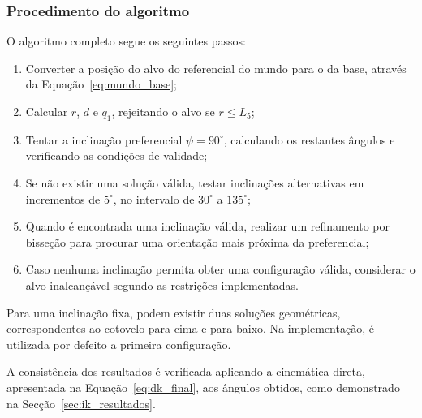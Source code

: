 \subsubsection*{Procedimento do algoritmo}

O algoritmo completo segue os seguintes passos:

\begin{enumerate}
    \item Converter a posição do alvo do referencial do mundo para o da base, através da Equação~\eqref{eq:mundo_base};

    \item Calcular $r$, $d$ e $q_1$, rejeitando o alvo se $r\leq L_5$;

    \item Tentar a inclinação preferencial $\psi=90^\circ$, calculando os restantes ângulos e verificando as condições de validade;

    \item Se não existir uma solução válida, testar inclinações alternativas em incrementos de $5^\circ$, no intervalo de $30^\circ$ a $135^\circ$;

    \item Quando é encontrada uma inclinação válida, realizar um refinamento por bisseção para procurar uma orientação mais próxima da preferencial;

    \item Caso nenhuma inclinação permita obter uma configuração válida, considerar o alvo inalcançável segundo as restrições implementadas.
\end{enumerate}

Para uma inclinação fixa, podem existir duas soluções geométricas, correspondentes ao cotovelo para cima e para baixo. Na implementação, é utilizada por defeito a primeira configuração.

A consistência dos resultados é verificada aplicando a cinemática direta, apresentada na Equação~\eqref{eq:dk_final}, aos ângulos obtidos, como demonstrado na Secção~\ref{sec:ik_resultados}.

\clearpage
